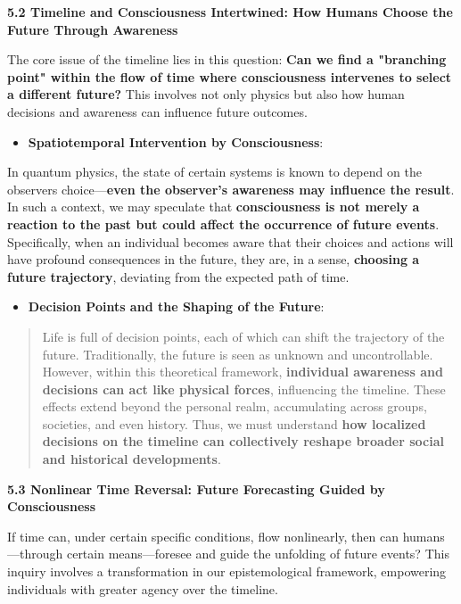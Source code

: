 \documentclass[
]{article}
\begin{document}
\textbf{5.2 Timeline and Consciousness Intertwined: How Humans Choose
the Future Through Awareness}

The core issue of the timeline lies in this question: \textbf{Can we
find a "branching point" within the flow of time where consciousness
intervenes to select a different future?} This involves not only physics
but also how human decisions and awareness can influence future
outcomes.

\begin{itemize}
\item
  \textbf{Spatiotemporal Intervention by Consciousness}:
\end{itemize}

In quantum physics, the state of certain systems is known to depend on
the observer\textquotesingle s choice---\textbf{even the observer's
awareness may influence the result}. In such a context, we may speculate
that \textbf{consciousness is not merely a reaction to the past but
could affect the occurrence of future events}. Specifically, when an
individual becomes aware that their choices and actions will have
profound consequences in the future, they are, in a sense,
\textbf{choosing a future trajectory}, deviating from the expected path
of time.

\begin{itemize}
\item
  \textbf{Decision Points and the Shaping of the Future}:
\end{itemize}

\begin{quote}
Life is full of decision points, each of which can shift the trajectory
of the future. Traditionally, the future is seen as unknown and
uncontrollable. However, within this theoretical framework,
\textbf{individual awareness and decisions can act like physical
forces}, influencing the timeline. These effects extend beyond the
personal realm, accumulating across groups, societies, and even history.
Thus, we must understand \textbf{how localized decisions on the timeline
can collectively reshape broader social and historical developments}.
\end{quote}

\textbf{5.3 Nonlinear Time Reversal: Future Forecasting Guided by
Consciousness}

If time can, under certain specific conditions, flow nonlinearly, then
can humans---through certain means---foresee and guide the unfolding of
future events? This inquiry involves a transformation in our
epistemological framework, empowering individuals with greater agency
over the timeline.
\end{document}
